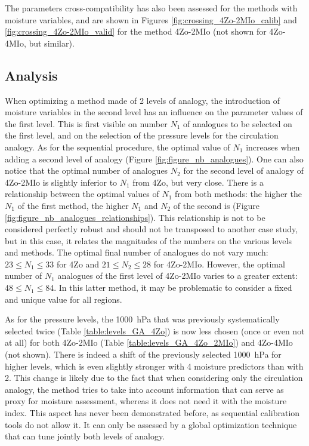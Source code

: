 \documentclass[review]{elsarticle}
\begin{document}
The parameters cross-compatibility has also been assessed for the methods with moisture variables, and are shown in Figures \ref{fig:crossing_4Zo-2MIo_calib} and \ref{fig:crossing_4Zo-2MIo_valid} for the method 4Zo-2MIo (not shown for 4Zo-4MIo, but similar).


\subsection{Analysis}

When optimizing a method made of 2 levels of analogy, the introduction of moisture variables in the second level has an influence on the parameter values of the first level. This is first visible on number $N_{1}$ of analogues to be selected on the first level, and on the selection of the pressure levels for the circulation analogy. As for the sequential procedure, the optimal value of $N_{1}$ increases when adding a second level of analogy (Figure \ref{fig:figure_nb_analogues}). One can also notice that the optimal number of analogues $N_{2}$ for the second level of analogy of 4Zo-2MIo is slightly inferior to $N_{1}$ from 4Zo, but very close. There is a relationship between the optimal values of $N_{1}$ from both methods: the higher the $N_{1}$ of the first method, the higher $N_{1}$ and $N_{2}$ of the second is (Figure \ref{fig:figure_nb_analogues_relationships}). This relationship is not to be considered perfectly robust and should not be transposed to another case study, but in this case, it relates the magnitudes of the numbers on the various levels and methods. The optimal final number of analogues do not vary much: $23 \leq N_{1} \leq 33$ for 4Zo and $21 \leq N_{2} \leq 28$ for 4Zo-2MIo. However, the optimal number of $N_{1}$ analogues of the first level of 4Zo-2MIo varies to a greater extent: $48 \leq N_{1} \leq 84$. In this latter method, it may be problematic to consider a fixed and unique value for all regions.

As for the pressure levels, the 1000~hPa that was previously systematically selected twice (Table \ref{table:levels_GA_4Zo}) is now less chosen (once or even not at all) for both 4Zo-2MIo (Table \ref{table:levels_GA_4Zo_2MIo}) and 4Zo-4MIo (not shown). There is indeed a shift of the previously selected 1000~hPa for higher levels, which is even slightly stronger with 4 moisture predictors than with 2. This change is likely due to the fact that when considering only the circulation analogy, the method tries to take into account information that can serve as proxy for moisture assessment, whereas it does not need it with the moisture index. This aspect has never been demonstrated before, as sequential calibration tools do not allow it. It can only be assessed by a global optimization technique that can tune jointly both levels of analogy. 
\end{document}
